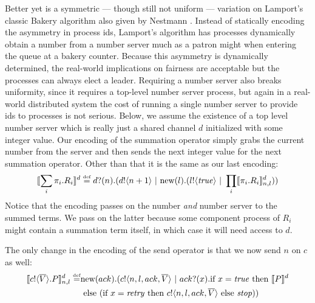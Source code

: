 Better yet is a symmetric --- though still not uniform --- variation on Lamport's classic Bakery algorithm \cite{lamp74} also given by Nestmann \cite{nestm00}.
Instead of statically encoding the asymmetry in process ids, Lamport's algorithm has processes dynamically obtain a number from a number server much as a patron might when entering the queue at a bakery counter.
Because this asymmetry is dynamically determined, the real-world implications on fairness are acceptable but the processes can always elect a leader.
Requiring a number server also breaks uniformity, since it requires a top-level number server process, but again in a real-world distributed system the cost of running a single number server to provide ids to processes is not serious.  
Below, we assume the existence of a top level number server which is really just a shared channel $d$ initialized with some integer value.  
Our encoding of the summation operator simply grabs the current number from the server and then sends the next integer value for the next summation operator.  
Other than that it is the same as our last encoding:
\[
	\llbracket{\displaystyle\sum_{i} \pi_i.R_i}\rrbracket^d \overset{\mbox{\tiny{def}}}{=} {d}?({n}).({d}!\langle{n+1}\rangle \ |\  \text{new}({l}).({l}!\langle{ \ensuremath{\text{\emph{true}}} }\rangle \ |\  \displaystyle\prod_{i}\llbracket{\pi_i.R_i}\rrbracket^d_{n,l}))
\]
Notice that the encoding passes on the number \emph{and} number server to the summed terms.  
We pass on the latter because some component process of $R_i$ might contain a summation term itself, in which case it will need access to $d$.

The only change in the encoding of the send operator is that we now send $n$ on $c$ as well:
\begin{equation*}\begin{split}
	\llbracket{ \ensuremath{{c}!\langle{ \ensuremath{\overline{V}} }\rangle.} P}\rrbracket^d_{n,l} \overset{\mbox{\tiny{def}}}{=} & \text{new}({ack}).({c}!\langle{n,l,ack, \ensuremath{\overline{V}} }\rangle \ |\  {ack}?({x}). \text{if } {x= \ensuremath{\text{\emph{true}}} } \text{ then } \llbracket{P}\rrbracket^d \\
	&\text{ else } (\text{if } {x= \ensuremath{\text{\emph{retry}}} } \text{ then } {c}!\langle{n,l,ack, \ensuremath{\overline{V}} }\rangle \text{ else } \mbox{\emph{stop}}))
\end{split}\end{equation*}

